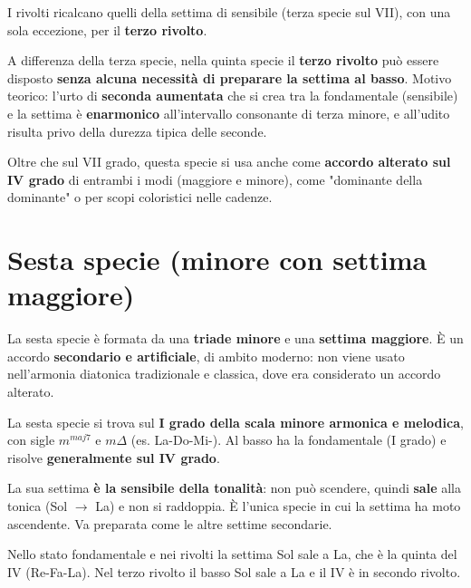 I rivolti ricalcano quelli della settima di sensibile (terza specie sul VII), con una sola eccezione, per il \textbf{terzo rivolto}.

\begin{osservazione}
	\label{oss:dim7_terzo_rivolto}
	A differenza della terza specie, nella quinta specie il \textbf{terzo rivolto} può essere disposto \textbf{senza alcuna necessità di preparare la settima al basso}. Motivo teorico: l'urto di \textbf{seconda aumentata} che si crea tra la fondamentale (sensibile) e la settima è \textbf{enarmonico} all'intervallo consonante di terza minore, e all'udito risulta privo della durezza tipica delle seconde.
\end{osservazione}

Oltre che sul VII grado, questa specie si usa anche come \textbf{accordo alterato sul IV grado} di entrambi i modi (maggiore e minore), come "dominante della dominante" o per scopi coloristici nelle cadenze.

\section{Sesta specie (minore con settima maggiore)}
\label{sec:sesta_specie_dettaglio}

La sesta specie è formata da una \textbf{triade minore} e una \textbf{settima maggiore}. È un accordo \textbf{secondario e artificiale}, di ambito moderno: non viene usato nell'armonia diatonica tradizionale e classica, dove era considerato un accordo alterato.

\begin{regola}
	\label{reg:sesta_specie}
	La sesta specie si trova sul \textbf{I grado della scala minore armonica e melodica}, con sigle $m^{maj7}$ e $m\Delta$ (es. La-Do-Mi-\Soldiesis). Al basso ha la fondamentale (I grado) e risolve \textbf{generalmente sul IV grado}.
\end{regola}

La sua settima \textbf{è la sensibile della tonalità}: non può scendere, quindi \textbf{sale} alla tonica (Sol\diesis{} $\rightarrow$ La) e non si raddoppia. È l'unica specie in cui la settima ha moto ascendente. Va preparata come le altre settime secondarie.

\begin{esempio}
	\label{ex:sesta_specie}
	Nello stato fondamentale e nei rivolti la settima Sol\diesis{} sale a La, che è la quinta del IV (Re-Fa-La). Nel terzo rivolto il basso Sol\diesis{} sale a La e il IV è in secondo rivolto.
\end{esempio}


